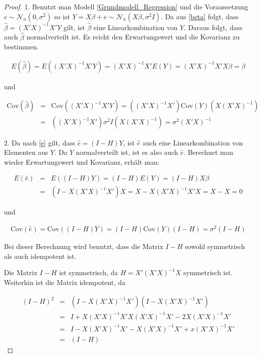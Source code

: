 \documentclass[12pt,a4paper]{article}
\theoremstyle{definition}
\theoremstyle{definition}
\theoremstyle{definition}
\theoremstyle{definition}
\begin{document}
\begin{proof}
1. 
Benutzt man Modell \eqref{Grundmodell_Regression} und die Voraussetzung $ e \sim \mathscr{N}_{n}(0,\sigma^2)$ so ist $Y=X \beta + e \sim \mathscr{N}_{n}(X\beta,\sigma^2 I)$. Da aus \eqref{beta} folgt, dass $\hat{\beta} = (X'X)^{-1} X' Y$ gilt, ist $\hat{\beta}$ eine Linearkombination von $Y$. Daraus folgt, dass auch $\hat{\beta}$ normalverteilt ist. Es reicht den Erwartungswert und die Kovarianz zu bestimmen. 

\begin{align*}
E(\hat{\beta}) = E((X'X)^{-1}X'Y) = (X'X)^{-1} X' E(Y) = (X'X)^{-1} X'X \beta = \beta
\end{align*}

und

\begin{eqnarray*}
\text{Cov}(\hat{\beta}) &=& \text{Cov}((X'X)^{-1} X' Y) = ((X'X)^{-1}X') \text{Cov}(Y) (X(X'X)^{-1}) \\
&=& ((X'X)^{-1}X') \sigma^2 I (X(X'X)^{-1}) = \sigma^2 (X'X)^{-1}
\end{eqnarray*}


2.
Da nach \eqref{e} gilt, dass $\hat{e}=(I-H)Y$, ist $\hat{e}$ auch eine Linearkombination von Elementen aus $Y$. Da $Y$ normalverteilt ist, ist es also auch $\hat{e}$. Berechnet man wieder Erwartungswert und Kovarianz, erhält man:

\begin{eqnarray*}
E(\hat{e}) &=& E((I-H)Y) = (I-H)E(Y) = (I-H)X\beta \\ 
&=& (I-X(X'X)^{-1}X')X = X-X(X'X)^{-1}X'X = X-X = 0
\end{eqnarray*}

und

\begin{align*}
\text{Cov}(\hat{e}) = \text{Cov}((I-H)Y) = (I-H) \text{Cov}(Y) (I-H) = \sigma^2 (I-H)
\end{align*}

Bei dieser Berechnung wird benutzt, dass die Matrix $I-H$ sowohl symmetrisch als auch idempotent ist. 

Die Matrix $I-H$ ist symmetrisch, da $H=X'(X'X)^{-1}X$ symmetrisch ist. Weiterhin ist die Matrix idempotent, da

\begin{eqnarray*}
(I-H)^2 &=& (I-X(X'X)^{-1}X')(I-X(X'X)^{-1}X') \\
&=& I + X(X'X)^{-1} X'X(X'X)^{-1}X' - 2 X(X'X)^{-1}X' \\
&=& I - X(X'X)^{-1}X' - X(X'X)^{-1}X'+ x(X'X)^{-1}X' \\
&=& (I-H)
\end{eqnarray*}


\end{proof}
\end{document}
